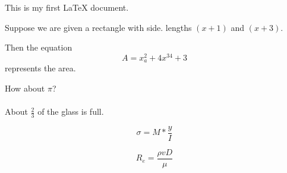 \documentclass[11pt]{article}
\begin{document}
This is my first LaTeX document.

Suppose we are given a rectangle with side.
lengths $(x+1)$ and $(x+3)$. 

Then the equation $$A=x_a^2+4x^{34}+3$$ represents the area.

How about $\pi$?
\\
\\
About $\displaystyle{\frac{2}{3}}$ of the glass is full.

$$\sigma=M*\frac{y}{I}$$

$$R_e=\frac{\rho v D}{\mu}$$
\end{document}
